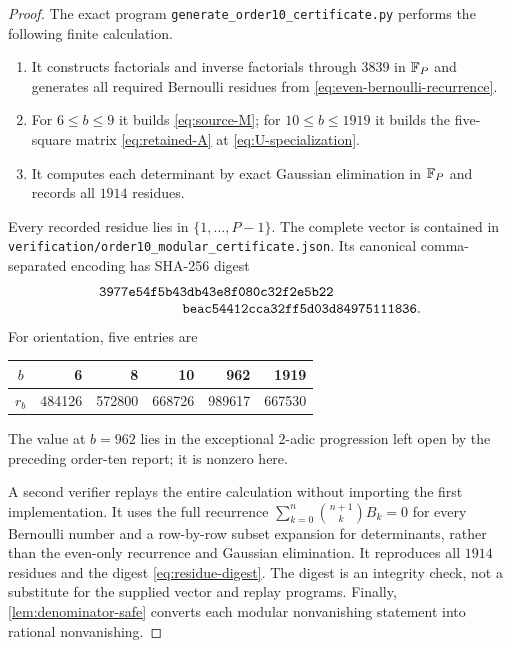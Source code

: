 \begin{proof}
The exact program \texttt{generate\_order10\_certificate.py} performs
the following finite calculation.

\begin{enumerate}
\item It constructs factorials and inverse factorials through $3839$
in $\mathbb{F}_P$ and generates all required Bernoulli residues from
\eqref{eq:even-bernoulli-recurrence}.
\item For $6\le b\le9$ it builds \eqref{eq:source-M}; for
$10\le b\le1919$ it builds the five-square matrix
\eqref{eq:retained-A} at \eqref{eq:U-specialization}.
\item It computes each determinant by exact Gaussian elimination in
$\mathbb{F}_P$ and records all $1914$ residues.
\end{enumerate}

Every recorded residue lies in $\{1,\ldots,P-1\}$.  The complete vector
is contained in \nolinkurl{verification/order10_modular_certificate.json}.  Its
canonical comma-separated encoding has SHA-256 digest
\begin{equation}
\begin{split}
&\texttt{3977e54f5b43db43e8f080c32f2e5b22}\\[-1mm]
&\hspace{21mm}\texttt{beac54412cca32ff5d03d84975111836}.
\end{split}
\label{eq:residue-digest}
\end{equation}
For orientation, five entries are
\begin{center}
\begin{tabular}{crrrrr}
\toprule
$b$&6&8&10&962&1919\\
\midrule
$r_b$&484126&572800&668726&989617&667530\\
\bottomrule
\end{tabular}
\end{center}
The value at $b=962$ lies in the exceptional $2$-adic progression left
open by the preceding order-ten report; it is nonzero here.

A second verifier replays the entire calculation without importing the
first implementation.  It uses the full recurrence
$\sum_{k=0}^n\binom{n+1}{k}B_k=0$ for every Bernoulli number and a
row-by-row subset expansion for determinants, rather than the even-only
recurrence and Gaussian elimination.  It reproduces all $1914$ residues
and the digest \eqref{eq:residue-digest}.  The digest is an integrity
check, not a substitute for the supplied vector and replay programs.
Finally, \cref{lem:denominator-safe} converts each modular nonvanishing
statement into rational nonvanishing.
\end{proof}

